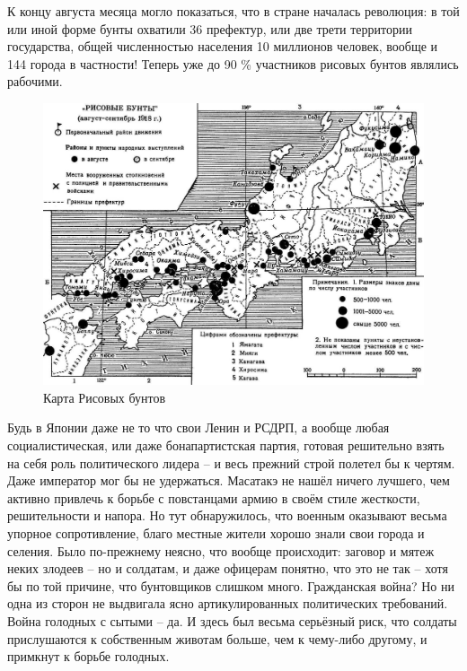 К концу августа месяца могло показаться, что в стране началась революция: в той или иной форме бунты охватили 36 префектур, или две трети территории государства, общей численностью населения 10 миллионов человек, вообще и 144 города в частности! Теперь уже до 90 \% участников рисовых бунтов являлись рабочими.

\begin{figure}[h!tb] 
	\centering\includegraphics[scale=0.3]{Glava5/obd57lK1104.jpg}
	\caption{Карта Рисовых бунтов}%
\end{figure}

 Будь в Японии даже не то что свои Ленин и РСДРП, а вообще любая социалистическая, или даже бонапартистская партия, готовая решительно взять на себя роль политического лидера – и весь прежний строй полетел бы к чертям. Даже император мог бы не удержаться. Масатакэ не нашёл ничего лучшего, чем активно привлечь к борьбе с повстанцами армию в своём стиле жесткости, решительности и напора. Но тут обнаружилось, что военным оказывают весьма упорное сопротивление, благо местные жители хорошо знали свои города и селения. Было по-прежнему неясно, что вообще происходит: заговор и мятеж неких злодеев – но и солдатам, и даже офицерам понятно, что это не так – хотя бы по той причине, что бунтовщиков слишком много. Гражданская война? Но ни одна из сторон не выдвигала ясно артикулированных политических требований. Война голодных с сытыми – да. И здесь был весьма серьёзный риск, что солдаты прислушаются к собственным животам больше, чем к чему-либо другому, и примкнут к борьбе голодных.

